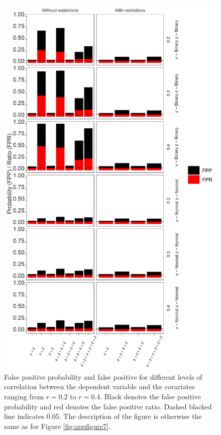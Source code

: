 \begin{landscape}
\begin{figure}[hbt!]
\includegraphics[scale=0.7]{R/Analysis/Result/Figures/Figure2SIBon.jpeg}
\centering
\caption{False positive probability and false positive for different levels of correlation between the dependent variable and the covariates ranging from  $\textit{r}=0.2$ to  $\textit{r}=0.4$. Black denotes the false positive probability and red denotes the false positive ratio. Dashed blacked line indicates 0.05. The description of the figure is otherwise the same as for Figure \ref{fig:appfigure7}.}
\label{fig:appfigure8}
\end{figure}
\end{landscape}


